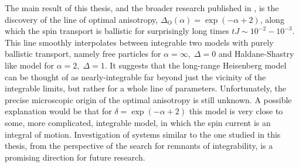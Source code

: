 The main result of this thesis, and the broader research published in \textcite{Mierzejewski2023}, is the
discovery of the line of optimal anisotropy, \(\Delta_{\mathrm{O}}(\alpha) = \exp(-\alpha +2)\),
along which the spin transport is ballistic for surprisingly long times \(tJ \sim 10^{-2} -10^{-3}\).
This line smoothly interpolates between integrable two models with purely ballistic
transport, namely free particles for \(\alpha =\infty,\; \Delta =0\) and Haldane-Shastry
like model for \(\alpha  = 2,\; \Delta  = 1\). It suggests that the long-range Heisenberg
model can be thought of as nearly-integrable far beyond just the vicinity of the
integrable limits, but rather for a whole line of parameters. Unfortunately, the precise
microscopic origin of the optimal anisotropy is still unknown. A possible explanation
would be that for \(\delta = \exp(-\alpha  + 2)\) this model is very close to some,
more complicated, integrable model, in which the spin current is an integral of motion.
Investigation of systems similar to the one studied in this thesis, from the perspective
of the search for remnants of integrability, is a promising direction for future research.
